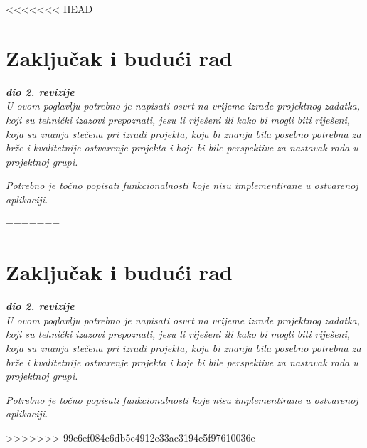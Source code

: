 <<<<<<< HEAD
\chapter{Zaključak i budući rad}

\textbf{\textit{dio 2. revizije}}\\

\textit{U ovom poglavlju potrebno je napisati osvrt na vrijeme izrade projektnog zadatka, koji su tehnički izazovi prepoznati, jesu li riješeni ili kako bi mogli biti riješeni, koja su znanja stečena pri izradi projekta, koja bi znanja bila posebno potrebna za brže i kvalitetnije ostvarenje projekta i koje bi bile perspektive za nastavak rada u projektnoj grupi.}

\textit{Potrebno je točno popisati funkcionalnosti koje nisu implementirane u ostvarenoj aplikaciji.}

=======
\chapter{Zaključak i budući rad}

\textbf{\textit{dio 2. revizije}}\\

\textit{U ovom poglavlju potrebno je napisati osvrt na vrijeme izrade projektnog zadatka, koji su tehnički izazovi prepoznati, jesu li riješeni ili kako bi mogli biti riješeni, koja su znanja stečena pri izradi projekta, koja bi znanja bila posebno potrebna za brže i kvalitetnije ostvarenje projekta i koje bi bile perspektive za nastavak rada u projektnoj grupi.}

\textit{Potrebno je točno popisati funkcionalnosti koje nisu implementirane u ostvarenoj aplikaciji.}

>>>>>>> 99e6ef084c6db5e4912c33ac3194c5f97610036e
\eject 